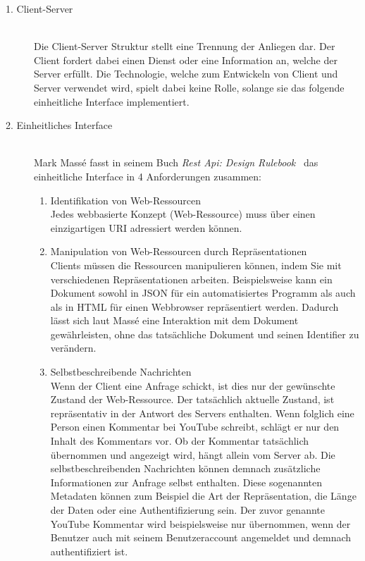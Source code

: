 \begin{description}

    \item[1. Client-Server]\hfill \\
    Die Client-Server Struktur stellt eine Trennung der Anliegen dar. Der Client
    fordert dabei einen Dienst oder eine Information an, welche der Server erfüllt.
    Die Technologie, welche zum Entwickeln von Client und Server verwendet wird,
    spielt dabei keine Rolle, solange sie das folgende einheitliche Interface implementiert.

    \item[2. Einheitliches Interface]\hfill \\
    Mark Massé fasst in seinem Buch \textit{Rest Api: Design Rulebook}~\cite{Mas11}
    das einheitliche Interface in 4 Anforderungen zusammen: 
    
    \begin{enumerate}
        \item Identifikation von Web-Ressourcen\hfill \\
        Jedes webbasierte Konzept (Web-Ressource) muss über einen einzigartigen 
        \gls{URI} adressiert werden können. 

        \item Manipulation von Web-Ressourcen durch Repräsentationen\hfill \\
        Clients müssen die Ressourcen manipulieren können, indem Sie mit verschiedenen
        Repräsentationen arbeiten. Beispielsweise kann ein Dokument sowohl in 
        \gls{JSON} für ein automatisiertes Programm als auch als in \gls{HTML} für 
        einen Webbrowser repräsentiert werden. Dadurch lässt sich laut Massé eine
        Interaktion mit dem Dokument gewährleisten, ohne das tatsächliche Dokument
        und seinen Identifier zu verändern.

        \item Selbstbeschreibende Nachrichten\hfill \\
        Wenn der Client eine Anfrage schickt, ist dies nur der gewünschte Zustand
        der Web-Ressource. Der tatsächlich aktuelle Zustand, ist repräsentativ in 
        der Antwort des Servers enthalten. Wenn folglich eine Person einen Kommentar bei 
        YouTube schreibt, schlägt er nur den Inhalt des Kommentars vor. Ob der 
        Kommentar tatsächlich übernommen und angezeigt wird, hängt allein vom 
        Server ab.
        Die selbstbeschreibenden Nachrichten können demnach zusätzliche Informationen zur 
        Anfrage selbst enthalten. Diese sogenannten Metadaten können zum Beispiel
        die Art der Repräsentation, die Länge der Daten oder eine Authentifizierung 
        sein. Der zuvor genannte YouTube Kommentar wird beispielsweise nur übernommen,
        wenn der Benutzer auch mit seinem Benutzeraccount angemeldet und demnach 
        authentifiziert ist. \\


\end{enumerate}
\end{description}
